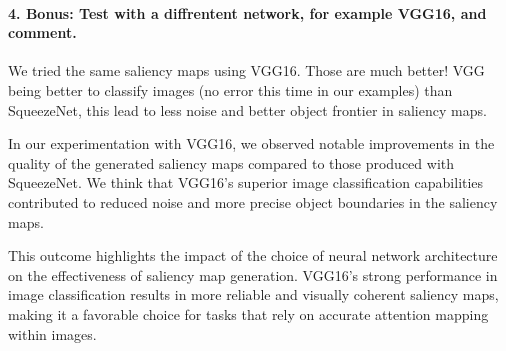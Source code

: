 
\paragraph*{4. \textbf{Bonus:} Test with a diffrentent network, for example VGG16, and comment.} \label{paragraph:bonus_VGG}
We tried the same saliency maps using VGG16. Those are much better! VGG being better to classify images (no error this time in our examples) than SqueezeNet, this lead to less noise and better object frontier in saliency maps.

In our experimentation with VGG16, we observed notable improvements in the quality of the generated saliency maps compared to those produced with SqueezeNet. We think that VGG16's superior image classification capabilities contributed to reduced noise and more precise object boundaries in the saliency maps.

This outcome highlights the impact of the choice of neural network architecture on the effectiveness of saliency map generation. VGG16's strong performance in image classification results in more reliable and visually coherent saliency maps, making it a favorable choice for tasks that rely on accurate attention mapping within images.

